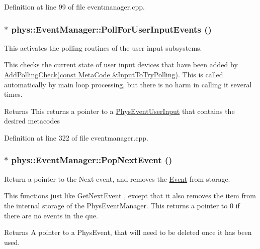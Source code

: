 Definition at line 99 of file eventmanager.cpp.

\hypertarget{classphys_1_1EventManager_aaa38d44f9fad236d68c66249428cc164}{
\subsubsection[{PollForUserInputEvents}]{ $\ast$ phys::EventManager::PollForUserInputEvents ()}}
\label{da/dde/classphys_1_1EventManager_aaa38d44f9fad236d68c66249428cc164}


This activates the polling routines of the user input subsystems. 

This checks the current state of user input devices that have been added by \hyperlink{classphys_1_1EventManager_a6ff66883358344908afd11204f79f196}{AddPollingCheck(const MetaCode \&InputToTryPolling)}. This is called automatically by main loop processing, but there is no harm in calling it several times. \begin{DoxyReturn}{Returns}
This returns a pointer to a \hyperlink{classPhysEventUserInput}{PhysEventUserInput} that contains the desired metacodes 
\end{DoxyReturn}


Definition at line 322 of file eventmanager.cpp.

\hypertarget{classphys_1_1EventManager_ac4f0c084cadd712233914c96fffdb2d5}{
\subsubsection[{PopNextEvent}]{ $\ast$ phys::EventManager::PopNextEvent ()}}
\label{da/dde/classphys_1_1EventManager_ac4f0c084cadd712233914c96fffdb2d5}


Return a pointer to the Next event, and removes the \hyperlink{classphys_1_1Event}{Event} from storage. 

This functions just like GetNextEvent , except that it also removes the item from the internal storage of the PhysEventManager. This returns a pointer to 0 if there are no events in the que. \begin{DoxyReturn}{Returns}
A pointer to a PhysEvent, that will need to be deleted once it has been used. 
\end{DoxyReturn}



